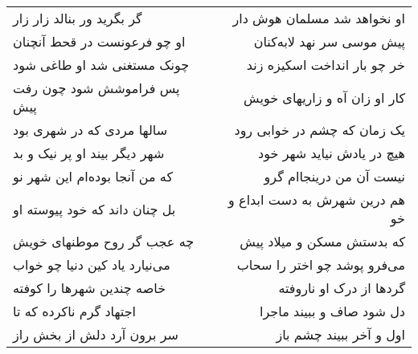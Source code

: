 \begin{center}
\begin{longtable}{l p{0.5cm} r}
\\
گر بگرید ور بنالد زار زار
&&
او نخواهد شد مسلمان هوش دار
\\
او چو فرعونست در قحط آنچنان
&&
پیش موسی سر نهد لابه‌کنان
\\
چونک مستغنی شد او طاغی شود
&&
خر چو بار انداخت اسکیزه زند
\\
پس فراموشش شود چون رفت پیش
&&
کار او زان آه و زاریهای خویش
\\
سالها مردی که در شهری بود
&&
یک زمان که چشم در خوابی رود
\\
شهر دیگر بیند او پر نیک و بد
&&
هیچ در یادش نیاید شهر خود
\\
که من آنجا بوده‌ام این شهر نو
&&
نیست آن من درینجاام گرو
\\
بل چنان داند که خود پیوسته او
&&
هم درین شهرش به دست ابداع و خو
\\
چه عجب گر روح موطنهای خویش
&&
که بدستش مسکن و میلاد پیش
\\
می‌نیارد یاد کین دنیا چو خواب
&&
می‌فرو پوشد چو اختر را سحاب
\\
خاصه چندین شهرها را کوفته
&&
گردها از درک او ناروفته
\\
اجتهاد گرم ناکرده که تا
&&
دل شود صاف و ببیند ماجرا
\\
سر برون آرد دلش از بخش راز
&&
اول و آخر ببیند چشم باز
\\
\end{longtable}
\end{center}
